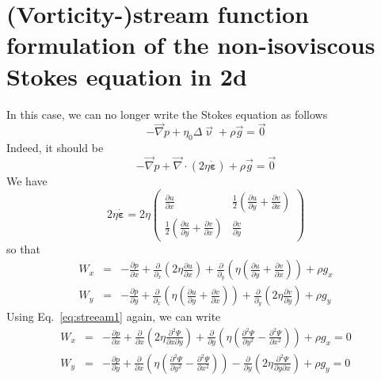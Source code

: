 \section{(Vorticity-)stream function formulation of the non-isoviscous Stokes equation in 2d}

In this case, we can no longer write the Stokes equation as follows
\begin{equation}
-{\vec \nabla}p + \eta_0 \Delta {\vec \upnu} + \rho {\vec g} = \vec{0}
\end{equation}
Indeed, it should be 
\begin{equation}
-{\vec \nabla}p + \vec\nabla \cdot (2 \eta \dot{\bm \varepsilon}) + \rho {\vec g} = \vec{0}
\end{equation}
We have
\[
2 \eta \dot{\bm \varepsilon}
= 2 \eta 
\left(
\begin{array}{cc}
\frac{\partial u}{\partial x} & \frac12 (\frac{\partial u}{\partial y}+\frac{\partial v}{\partial x}) \\
\frac12 (\frac{\partial u}{\partial y}+\frac{\partial v}{\partial x}) & \frac{\partial v}{\partial y} 
\end{array}
\right)
\]
so that 
\begin{eqnarray}
W_x&=&-\frac{\partial p}{\partial x} 
+ \frac{\partial }{\partial_x} \left(2\eta \frac{\partial u}{\partial x} \right)
+ \frac{\partial }{\partial_y} \left( \eta (\frac{\partial u}{\partial y}+\frac{\partial v}{\partial x}) \right)
+ \rho g_x\\
W_y&=&-\frac{\partial p}{\partial y} 
+ \frac{\partial }{\partial_x} \left( \eta (\frac{\partial u}{\partial y}+\frac{\partial v}
{\partial x}) \right) 
+ \frac{\partial }{\partial_y} \left(2\eta \frac{\partial v}{\partial y} \right)
+ \rho g_y
\end{eqnarray}
Using Eq.~\eqref{eq:streeam1} again, we can write 
\begin{eqnarray}
W_x&=&-\frac{\partial p}{\partial x} 
+ \frac{\partial }{\partial x} \left(2\eta \frac{\partial^2 \Psi}{\partial x \partial y} \right)
+ \frac{\partial }{\partial y} \left( \eta (\frac{\partial^2 \Psi}{\partial y^2}-\frac{\partial^2 \Psi}{\partial x^2}) \right)
+ \rho g_x = 0\\
W_y&=&-\frac{\partial p}{\partial y} 
+ \frac{\partial }{\partial x} \left( \eta (\frac{\partial^2 \Psi}{\partial y^2}-\frac{\partial^2 \Psi}{\partial x^2}) \right) 
- \frac{\partial }{\partial y} \left(2\eta \frac{\partial^2 \Psi}{\partial y \partial x} \right)
+ \rho g_y = 0
\end{eqnarray}
